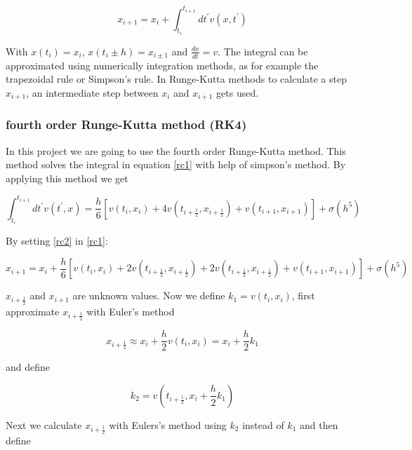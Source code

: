 \documentclass[10pt,a4paper]{article}
\begin{document}
\begin{equation}
\label{rc1}
x_{i+1} = x_i + \int_{t_i}^{t_{i+1}} dt^{'} v(x, t^{'})
\end{equation}

With $x(t_i) = x_i$, $x(t_i \pm h) = x_{i \pm 1}$ and $\frac{dx}{dt} = v$. The integral can be approximated using numerically integration methods, as for example the trapezoidal rule or Simpson's rule. In Runge-Kutta methods to calculate a step $x_{i+1}$, an intermediate step between $x_i$ and $x_{i+1}$ gets used.

\subsubsection{fourth order Runge-Kutta method (RK4)}
\label{subsubsec:rc4}

In this project we are going to use the fourth order Runge-Kutta method. This method solves the integral in equation \eqref{rc1} with help of simpson's method. By applying this method we get

\begin{equation}
\label{rc2}
\int_{t_i}^{t_{i+1}} dt^{'} v(t^{'}, x) = \frac{h}{6} [v(t_i, x_i) +4 v(t_{i+\frac{1}{2}}, x_{i+\frac{1}{2}}) + v(t_{i+1}, x_{i+1})] + \sigma(h^5)
\end{equation}

By setting \eqref{rc2} in \eqref{rc1}:

\begin{equation}
\label{rc3}
x_{i+1} = x_i + \frac{h}{6} [v(t_i, x_i) + 2 v(t_{i+\frac{1}{2}}, x_{i+\frac{1}{2}}) + 2 v(t_{i+\frac{1}{2}}, x_{i+\frac{1}{2}}) + v(t_{i+1}, x_{i+1})] + \sigma(h^5)
\end{equation}

$x_{i+\frac{1}{2}}$ and $x_{i+1}$ are unknown values. Now we define $k_1 = v(t_i, x_i)$, first approximate $x_{i+\frac{1}{2}}$ with Euler's method

\begin{equation}
\label{s:rc4}
x_{i+\frac{1}{2}} \approx x_i + \frac{h}{2} v(t_i, x_i) = x_i + \frac{h}{2} k_1
\end{equation}

and define

\begin{equation}
\label{rc5}
k_2 = v(t_{i+\frac{1}{2}}, x_i + \frac{h}{2} k_1)
\end{equation}

Next we calculate $x_{i + \frac{1}{2}}$ with Eulers's method using $k_2$ instead of $k_1$ and then define
\end{document}
